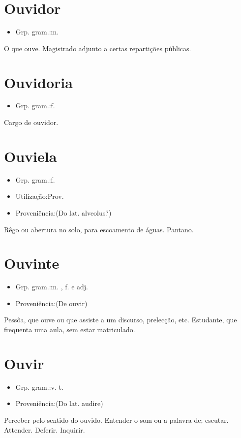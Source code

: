 \section{Ouvidor}
\begin{itemize}
\item {Grp. gram.:m.}
\end{itemize}
O que ouve.
Magistrado adjunto a certas repartições públicas.
\section{Ouvidoria}
\begin{itemize}
\item {Grp. gram.:f.}
\end{itemize}
Cargo de ouvidor.
\section{Ouviela}
\begin{itemize}
\item {Grp. gram.:f.}
\end{itemize}
\begin{itemize}
\item {Utilização:Prov.}
\end{itemize}
\begin{itemize}
\item {Proveniência:(Do lat. \textunderscore alveolus\textunderscore ?)}
\end{itemize}
Rêgo ou abertura no solo, para escoamento de águas.
Pantano.
\section{Ouvinte}
\begin{itemize}
\item {Grp. gram.:m. ,  f.  e  adj.}
\end{itemize}
\begin{itemize}
\item {Proveniência:(De \textunderscore ouvir\textunderscore )}
\end{itemize}
Pessôa, que ouve ou que assiste a um discurso, prelecção, etc.
Estudante, que frequenta uma aula, sem estar matriculado.
\section{Ouvir}
\begin{itemize}
\item {Grp. gram.:v. t.}
\end{itemize}
\begin{itemize}
\item {Proveniência:(Do lat. \textunderscore audire\textunderscore )}
\end{itemize}
Perceber pelo sentido do ouvido.
Entender o som ou a palavra de; escutar.
Attender.
Deferir.
Inquirir.
